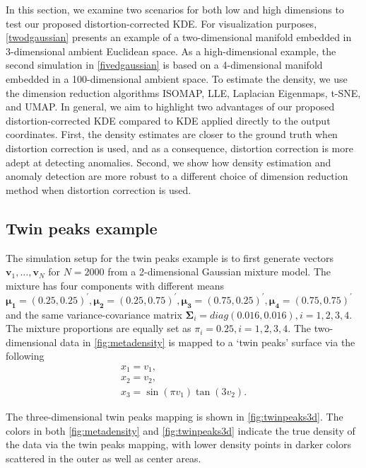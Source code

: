 \documentclass[12pt]{article}
\begin{document}
In this section, we examine two scenarios for both low and high dimensions to test our proposed distortion-corrected KDE. For visualization purposes, \autoref{twodgaussian} presents an example of a two-dimensional manifold embedded in 3-dimensional ambient Euclidean space. As a high-dimensional example, the second simulation in \autoref{fivedgaussian} is based on a 4-dimensional manifold embedded in a 100-dimensional ambient space. To estimate the density, we use the dimension reduction algorithms ISOMAP, LLE, Laplacian Eigenmaps, t-SNE, and UMAP. In general, we aim to highlight two advantages of our proposed distortion-corrected KDE compared to KDE applied directly to the output coordinates. First, the density estimates are closer to the ground truth when distortion correction is used, and as a consequence, distortion correction is more adept at detecting anomalies. Second, we show how density estimation and anomaly detection are more robust to a different choice of dimension reduction method when distortion correction is used.

\hypertarget{twodgaussian}{%
\subsection{Twin peaks example}\label{twodgaussian}}

The simulation setup for the twin peaks example is to first generate vectors \(\bm{v}_1,\dots,\bm{v}_N\) for \(N=2000\) from a 2-dimensional Gaussian mixture model. The mixture has four components with different means
\(\bm{\mu_1}=(0.25, 0.25)^\prime, \bm{\mu_2}=(0.25, 0.75)^\prime, \bm{\mu_3}=(0.75, 0.25)^\prime, \bm{\mu_4}=(0.75, 0.75)^\prime\) and the same variance-covariance matrix \(\bm{\Sigma}_i=diag(0.016, 0.016), i=1,2,3,4\). The mixture proportions
are equally set as \(\pi_i=0.25, i=1,2,3,4\). The two-dimensional data in \autoref{fig:metadensity} is mapped to a `twin peaks' surface via the following
\begin{equation}
\label{eq:twinpeak}
\begin{array}{lcl}
x_1 = v_1, \\
x_2 = v_2, \\
x_3 = \sin(\pi v_1) \tan (3 v_2).
\end{array}
\end{equation}

The three-dimensional twin peaks mapping is shown in \autoref{fig:twinpeaks3d}. The colors in both \autoref{fig:metadensity} and \autoref{fig:twinpeaks3d} indicate the true density of the data via the twin peaks mapping, with lower density points in darker colors scattered in the outer as well as center areas.
\end{document}
